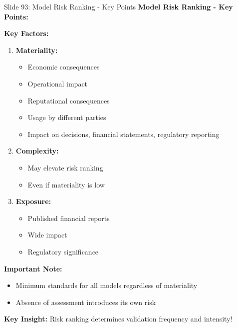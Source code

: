 \documentclass[8pt]{beamer}
\begin{document}
	\begin{frame}{Slide 93: Model Risk Ranking - Key Points}
		\fontsize{6.5}{7.5}\selectfont
		\textbf{Model Risk Ranking - Key Points:}
		
		\vspace{0.1cm}
		\textbf{Key Factors:}
		\begin{enumerate}
			\item \textbf{Materiality:}
			\begin{itemize}
				\item Economic consequences
				\item Operational impact
				\item Reputational consequences
				\item Usage by different parties
				\item Impact on decisions, financial statements, regulatory reporting
			\end{itemize}
			\item \textbf{Complexity:}
			\begin{itemize}
				\item May elevate risk ranking
				\item Even if materiality is low
			\end{itemize}
			\item \textbf{Exposure:}
			\begin{itemize}
				\item Published financial reports
				\item Wide impact
				\item Regulatory significance
			\end{itemize}
		\end{enumerate}
		
		\vspace{0.1cm}
		\textbf{Important Note:}
		\begin{itemize}
			\item Minimum standards for all models regardless of materiality
			\item Absence of assessment introduces its own risk
		\end{itemize}
		
		\textcolor{myblue}{\textbf{Key Insight:}} Risk ranking determines \textcolor{myblue}{validation frequency and intensity}!
	\end{frame}
	
\end{document}
